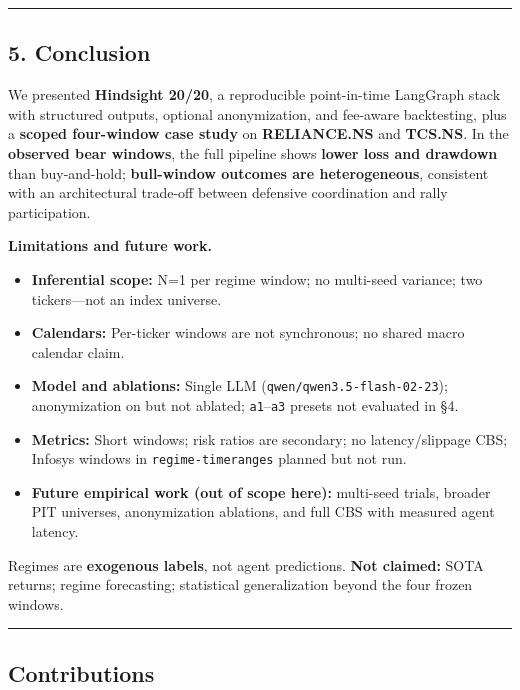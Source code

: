 \documentclass[
]{article}
\providecommand{\tightlist}{%
  \setlength{\itemsep}{0pt}\setlength{\parskip}{0pt}}
\begin{document}
\begin{center}\rule{0.5\linewidth}{0.5pt}\end{center}

\subsection{5. Conclusion}\label{conclusion}

We presented \textbf{Hindsight 20/20}, a reproducible point-in-time
LangGraph stack with structured outputs, optional anonymization, and
fee-aware backtesting, plus a \textbf{scoped four-window case study} on
\textbf{RELIANCE.NS} and \textbf{TCS.NS}. In the \textbf{observed bear
windows}, the full pipeline shows \textbf{lower loss and drawdown} than
buy-and-hold; \textbf{bull-window outcomes are heterogeneous},
consistent with an architectural trade-off between defensive
coordination and rally participation.

\textbf{Limitations and future work.}

\begin{itemize}
\tightlist
\item
  \textbf{Inferential scope:} N=1 per regime window; no multi-seed
  variance; two tickers---not an index universe.
\item
  \textbf{Calendars:} Per-ticker windows are not synchronous; no shared
  macro calendar claim.
\item
  \textbf{Model and ablations:} Single LLM
  (\texttt{qwen/qwen3.5-flash-02-23}); anonymization on but not ablated;
  \texttt{a1}--\texttt{a3} presets not evaluated in §4.
\item
  \textbf{Metrics:} Short windows; risk ratios are secondary; no
  latency/slippage CBS; Infosys windows in \texttt{regime-timeranges}
  planned but not run.
\item
  \textbf{Future empirical work (out of scope here):} multi-seed trials,
  broader PIT universes, anonymization ablations, and full CBS with
  measured agent latency.
\end{itemize}

Regimes are \textbf{exogenous labels}, not agent predictions.
\textbf{Not claimed:} SOTA returns; regime forecasting; statistical
generalization beyond the four frozen windows.

\begin{center}\rule{0.5\linewidth}{0.5pt}\end{center}

\subsection{Contributions}\label{contributions}
\end{document}
